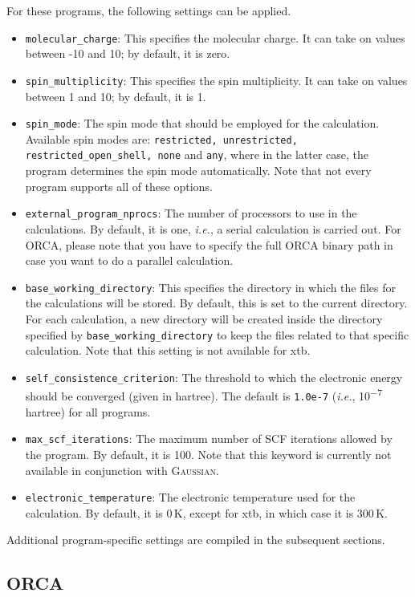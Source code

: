 \documentclass[]{tufte-book}
\begin{document}
For these programs, the following settings can be applied.
\begin{itemize}
\item \texttt{molecular\_charge}: This specifies the molecular charge. It can take on values between -10 and 10; by default,
it is zero.
\item \texttt{spin\_multiplicity}: This specifies the spin multiplicity. It can take on values between 1 and 10; by default,
it is 1.
\item \texttt{spin\_mode}: The spin mode that should be employed for the calculation. Available spin modes are: \texttt{restricted, unrestricted, restricted\_open\_shell, none} and \texttt{any}, where in the latter case, the program determines the spin mode automatically. Note that not every program supports all of these options.
\item \texttt{external\_program\_nprocs}: The number of processors to use in the calculations. By default, it is one, \textit{i.e.},
a serial calculation is carried out. For \textsc{ORCA}, please note that you have to specify the full \textsc{ORCA} binary path in case you want to do a parallel calculation.
\item \texttt{base\_working\_directory}: This specifies the directory in which the files for the calculations will
be stored. By default, this is set to the current directory. For each calculation, a new directory will be
created inside the directory specified by \texttt{base\_working\_directory} to keep the files related to that specific
calculation. Note that this setting is not available for xtb.
\item \texttt{self\_consistence\_criterion}: The threshold to which the electronic energy should be converged (given in
hartree). The default is \texttt{1.0e-7} (\textit{i.e.}, 10\textsuperscript{$-$7}\,hartree) for all programs.
\item \texttt{max\_scf\_iterations}: The maximum number of SCF iterations allowed by the program. By default, it is 100. Note that this keyword is currently not available in conjunction with \textsc{Gaussian}.
\item \texttt{electronic\_temperature}: The electronic temperature used for the calculation. By default, it is 0\,K, except for xtb, in which case it is 300\,K.
\end{itemize}

Additional program-specific settings are compiled in the subsequent sections.

\subsection{\textsc{ORCA}}
\end{document}
